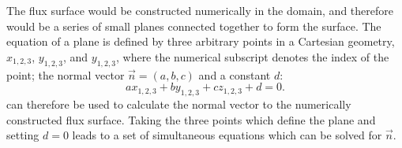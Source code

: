 The flux surface would be constructed numerically in the domain, and therefore would be a series of small planes connected together to form the surface.
The equation of a plane is defined by three arbitrary points in a Cartesian geometry, $x_{1,2,3}$, $y_{1,2,3}$, and $y_{1,2,3}$, where the numerical subscript denotes the index of the point; the normal vector $\vec{n}=(a,b,c)$ and a constant $d$:
\begin{equation}
    ax_{1,2,3}+by_{1,2,3}+cz_{1,2,3}+d=0.
    \label{eq:plane}
\end{equation}
 can therefore be used to calculate the normal vector to the numerically constructed flux surface.
Taking the three points which define the plane and setting $d=0$ leads to a set of simultaneous equations which can be solved for $\vec{n}$.


